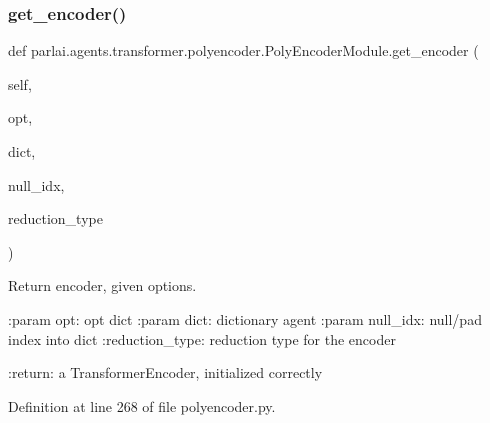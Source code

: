 \mbox{\label{classparlai_1_1agents_1_1transformer_1_1polyencoder_1_1PolyEncoderModule_acd213717123d2f2f24e6f03270c3db14}} 
\subsubsection{\texorpdfstring{get\+\_\+encoder()}{get\_encoder()}}
{\footnotesize\ttfamily def parlai.\+agents.\+transformer.\+polyencoder.\+Poly\+Encoder\+Module.\+get\+\_\+encoder (\begin{DoxyParamCaption}\item[{}]{self,  }\item[{}]{opt,  }\item[{}]{dict,  }\item[{}]{null\+\_\+idx,  }\item[{}]{reduction\+\_\+type }\end{DoxyParamCaption})}

\begin{DoxyVerb}Return encoder, given options.

:param opt:
    opt dict
:param dict:
    dictionary agent
:param null_idx:
    null/pad index into dict
:reduction_type:
    reduction type for the encoder

:return:
    a TransformerEncoder, initialized correctly
\end{DoxyVerb}
 

Definition at line 268 of file polyencoder.\+py.


